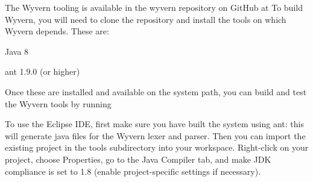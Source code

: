 \documentclass{article}
\begin{document}
\newcommand{\keyw}[1]{\textbf{#1}}\begin{mdP}[class={para-continue},data-line={13}]%
{}The Wyvern tooling is available in the wyvern repository on GitHub at
{}%
{}  To build Wyvern, you
will need to clone the repository and install the tools on which Wyvern
depends.  These are:%
\end{mdP}%
\begin{mdUl}[class={ul,list-star,compact},elem={ul},data-line={18}]%
\begin{mdLi}[class={li,ul-li,list-star-li,compact-li},label={[(1)]\{.ul-li-label\}},elem={li},data-line={18}]%
{}Java 8%
\end{mdLi}%
\begin{mdLi}[class={li,ul-li,list-star-li,compact-li},label={[(2)]\{.ul-li-label\}},elem={li},data-line={19}]%
{}ant 1.9.0 (or higher)%
\end{mdLi}%
\end{mdUl}%
\begin{mdP}[data-line={21}]%
{}Once these are installed and available on the system path, you can
build and test the Wyvern tools by running%
\end{mdP}%
\begin{mdPre}[class={para-block,pre-indented},data-line={24}]%
%
\end{mdPre}%
\begin{mdP}[data-line={26}]%
{}To use the Eclipse IDE, first make sure you have built the system
using ant: this will generate java files for the Wyvern lexer and
parser.  Then you can import the existing project in the tools
subdirectory into your workspace.  Right-click on your project,
choose Properties, go to the Java Compiler tab, and make JDK
compliance is set to 1.8 (enable project-specific settings
if necessary).%
\end{mdP}%
\end{document}
